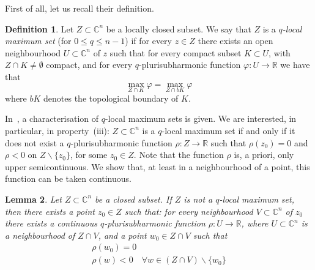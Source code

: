 \documentclass[reqno,oneside]{amsart}
\newcommand{\numberset}{\mathbb}
\newcommand{\R}{\numberset{R}}
\newcommand{\C}{\numberset{C}}
\renewcommand{\phi}{\varphi}
\theoremstyle{definition}
\newtheorem{definition}{Definition}[section]
\theoremstyle{plain}
\newtheorem{lemma}[definition]{Lemma}
\theoremstyle{remark}
\begin{document}
First of all, let us recall their definition.
\begin{definition}
\label{def:locmaxset}
	Let $Z\subset\C^n$ be a locally closed subset. We say that $Z$ is a \emph{$q$-local maximum set} (for $0\leq q\leq n-1$) if for every $z\in Z$ there exists an open neighbourhood $U\subset\C^n$ of $z$ such that for every compact subset $K\subset U$, with $Z\cap K\neq\emptyset$ compact, and for every $q$-plurisubharmonic function $\phi:U\to\R$ we have that
	\[
		\max_{Z\cap K}\phi=\max_{Z\cap bK}\phi
	\]
	where $bK$ denotes the topological boundary of $K$.
\end{definition}

In~\cite[Theorem~5.1]{slodkowski:loc_max_property}, a characterisation of $q$-local maximum sets is given. We are interested, in particular, in property~(iii): $Z\subset\C^n$ is a $q$-local maximum set if and only if it does not exist a $q$-plurisubharmonic function $\rho:Z\to\R$ such that $\rho(z_0)=0$ and $\rho<0$ on $Z\smallsetminus\{z_0\}$, for some $z_0\in Z$. Note that the function $\rho$ is, a priori, only upper semicontinuous. We show that, at least in a neighbourhood of a point, this function can be taken continuous.
\begin{lemma}
\label{lemma:lms_basis'}
	Let $Z\subset\C^n$ be a closed subset. If $Z$ is not a $q$-local maximum set, then there exists a point $z_0\in Z$ such that: for every neighbourhood $V\subset\C^n$ of $z_0$ there exists a continuous $q$-plurisubharmonic function $\rho:U\to\R$, where $U\subset\C^n$ is a neighbourhood of $Z\cap V$, and a point $w_0\in Z\cap V$ such that
	\begin{gather*}
		\rho(w_0)=0 \\
		\rho(w)<0 \quad \forall w\in (Z\cap V)\smallsetminus\{w_0\}
	\end{gather*}
\end{lemma}
\end{document}
